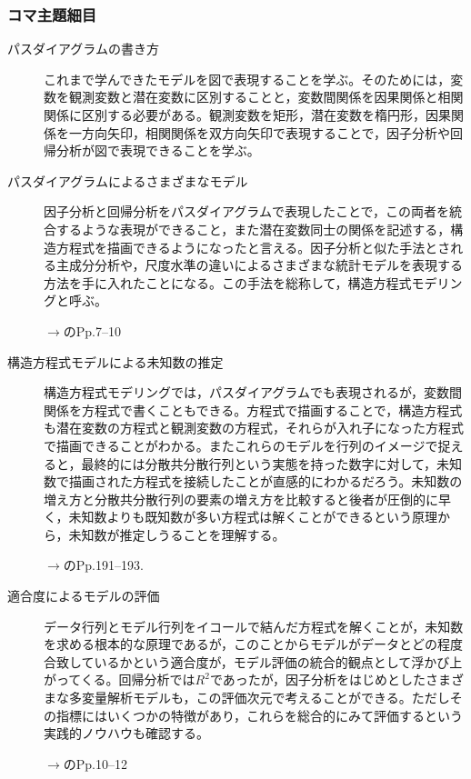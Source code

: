 \subsubsection{コマ主題細目}
\begin{description}
	\item[パスダイアグラムの書き方] これまで学んできたモデルを図で表現することを学ぶ。そのためには，変数を観測変数と潜在変数に区別することと，変数間関係を因果関係と相関関係に区別する必要がある。観測変数を矩形，潜在変数を楕円形，因果関係を一方向矢印，相関関係を双方向矢印で表現することで，因子分析や回帰分析が図で表現できることを学ぶ。

	\item[パスダイアグラムによるさまざまなモデル] 因子分析と回帰分析をパスダイアグラムで表現したことで，この両者を統合するような表現ができること，また潜在変数同士の関係を記述する，構造方程式を描画できるようになったと言える。因子分析と似た手法とされる主成分分析や，尺度水準の違いによるさまざまな統計モデルを表現する方法を手に入れたことになる。この手法を総称して，構造方程式モデリングと呼ぶ。

	      \begin{flushright}
		      $\to$\citet{Kosugi2014Mplus}のPp.7--10
	      \end{flushright}


	\item[構造方程式モデルによる未知数の推定] 構造方程式モデリングでは，パスダイアグラムでも表現されるが，変数間関係を方程式で書くこともできる。方程式で描画することで，構造方程式も潜在変数の方程式と観測変数の方程式，それらが入れ子になった方程式で描画できることがわかる。またこれらのモデルを行列のイメージで捉えると，最終的には分散共分散行列という実態を持った数字に対して，未知数で描画された方程式を接続したことが直感的にわかるだろう。未知数の増え方と分散共分散行列の要素の増え方を比較すると後者が圧倒的に早く，未知数よりも既知数が多い方程式は解くことができるという原理から，未知数が推定しうることを理解する。

	      \begin{flushright}
		      $\to$\citet{kosugi2018}のPp.191--193.
	      \end{flushright}

	\item[適合度によるモデルの評価]  データ行列とモデル行列をイコールで結んだ方程式を解くことが，未知数を求める根本的な原理であるが，このことからモデルがデータとどの程度合致しているかという適合度が，モデル評価の統合的観点として浮かび上がってくる。回帰分析では$R^2$であったが，因子分析をはじめとしたさまざまな多変量解析モデルも，この評価次元で考えることができる。ただしその指標にはいくつかの特徴があり，これらを総合的にみて評価するという実践的ノウハウも確認する。


	      \begin{flushright}
		      $\to$\citet{Kosugi2014Mplus}のPp.10--12
	      \end{flushright}


\end{description}
